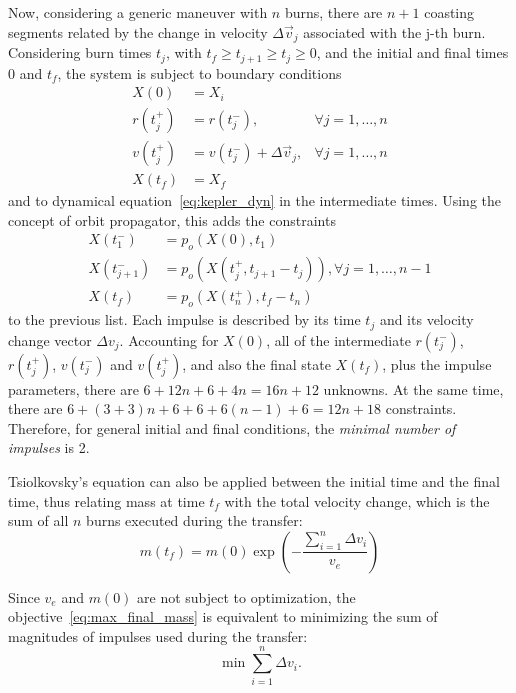 Now, considering a generic maneuver with \(n\) burns, there are \(n+1\) coasting segments related by the change in velocity \(\Delta \vec v_j\) associated with the j-th burn. Considering burn times \(t_j\), with \(t_f \geq t_{j+1} \geq t_j \geq 0\), and the initial and final times \(0\) and \(t_f\), the system is subject to boundary conditions
\begin{align}
    X(0) &= X_i \\
    r(t_j^+) &= r(t_j^-),& \forall j=1,\dots,n \\
    v(t_j^+) &= v(t_j^-) + \Delta \vec v_j,& \forall j=1,\dots,n \\
    X(t_f) &= X_f
\end{align}
and to dynamical equation~\eqref{eq:kepler_dyn} in the intermediate times. Using the concept of orbit propagator, this adds the constraints
\begin{align}
    X(t_1^-) &= p_o(X(0), t_1) \\
    X(t_{j+1}^-) &= p_o(X(t_j^+, t_{j+1} - t_j)), \forall j = 1, \dots, n-1 \\
    X(t_f) &= p_o(X(t_n^+), t_f - t_n)
\end{align}
to the previous list. Each impulse is described by its time \(t_j\) and its velocity change vector \(\Delta v_j\). Accounting for \(X(0)\), all of the intermediate \(r(t_j^-)\), \(r(t_j^+)\), \(v(t_j^-)\) and \(v(t_j^+)\), and also the final state \(X(t_f)\), plus the impulse parameters, there are \(6 + 12n + 6 + 4n = 16n + 12\) unknowns. At the same time, there are \(6 + (3 + 3)n + 6 + 6 + 6(n-1) + 6 = 12n + 18\) constraints. Therefore, for general initial and final conditions, the \textit{minimal number of impulses} is 2. 


Tsiolkovsky's equation can also be applied between the initial time and the final time, thus relating mass at time \(t_f\) with the total velocity change, which is the sum of all \(n\) burns executed during the transfer:
\begin{equation}
    m(t_f) = m(0) \exp{\left(-\frac{\sum_{i=1}^{n}\Delta v_i}{v_e}\right)}
\end{equation}

Since \(v_e\) and \(m(0)\) are not subject to optimization, the objective~\eqref{eq:max_final_mass} is equivalent to minimizing the sum of magnitudes of impulses used during the transfer:
\begin{equation}
    \min \sum_{i=1}^{n} \Delta v_i.
\end{equation}

